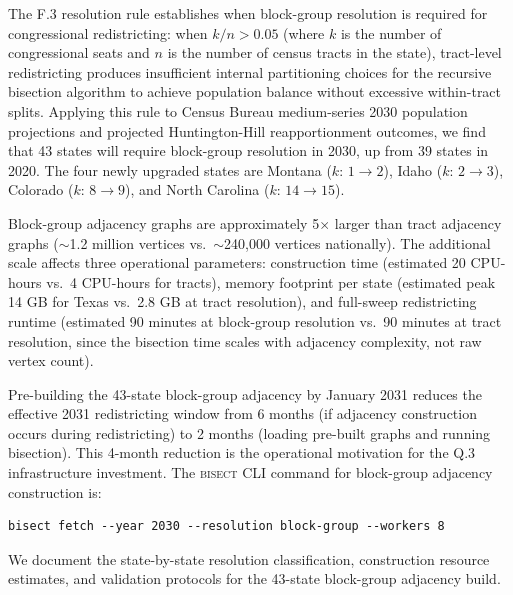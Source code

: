The F.3 resolution rule establishes when block-group resolution is required for
congressional redistricting: when $k/n > 0.05$ (where $k$ is the number of congressional
seats and $n$ is the number of census tracts in the state), tract-level redistricting
produces insufficient internal partitioning choices for the recursive bisection algorithm
to achieve population balance without excessive within-tract splits. Applying this rule
to Census Bureau medium-series 2030 population projections and projected Huntington-Hill
reapportionment outcomes, we find that 43 states will require block-group resolution
in 2030, up from 39 states in 2020. The four newly upgraded states are Montana ($k$: $1\to2$),
Idaho ($k$: $2\to3$), Colorado ($k$: $8\to9$), and North Carolina ($k$: $14\to15$).

Block-group adjacency graphs are approximately 5$\times$ larger than tract adjacency
graphs ($\sim$1.2 million vertices vs.\ $\sim$240{,}000 vertices nationally). The additional
scale affects three operational parameters: construction time (estimated 20 CPU-hours
vs.\ 4 CPU-hours for tracts), memory footprint per state (estimated peak 14 GB for Texas
vs.\ 2.8 GB at tract resolution), and full-sweep redistricting runtime (estimated 90 minutes
at block-group resolution vs.\ 90 minutes at tract resolution, since the bisection time
scales with adjacency complexity, not raw vertex count).

Pre-building the 43-state block-group adjacency by January 2031 reduces the effective
2031 redistricting window from 6 months (if adjacency construction occurs during
redistricting) to 2 months (loading pre-built graphs and running bisection). This
4-month reduction is the operational motivation for the Q.3 infrastructure investment.
The \textsc{bisect} CLI command for block-group adjacency construction is:

\begin{verbatim}
bisect fetch --year 2030 --resolution block-group --workers 8
\end{verbatim}

We document the state-by-state resolution classification, construction resource
estimates, and validation protocols for the 43-state block-group adjacency build.
